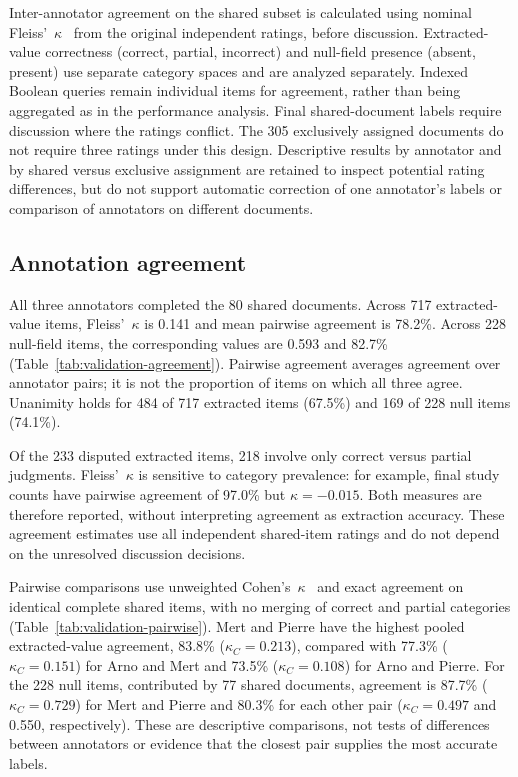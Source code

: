 Inter-annotator agreement on the shared subset is calculated using nominal Fleiss'~$\kappa$~\cite{fleiss:1971} from the original independent ratings, before discussion. Extracted-value correctness (correct, partial, incorrect) and null-field presence (absent, present) use separate category spaces and are analyzed separately. Indexed Boolean queries remain individual items for agreement, rather than being aggregated as in the performance analysis. Final shared-document labels require discussion where the ratings conflict. The 305 exclusively assigned documents do not require three ratings under this design. Descriptive results by annotator and by shared versus exclusive assignment are retained to inspect potential rating differences, but do not support automatic correction of one annotator's labels or comparison of annotators on different documents.

\subsection*{Annotation agreement}
All three annotators completed the 80 shared documents. Across 717 extracted-value items, Fleiss'~$\kappa$ is 0.141 and mean pairwise agreement is 78.2\%. Across 228 null-field items, the corresponding values are 0.593 and 82.7\% (Table~\ref{tab:validation-agreement}). Pairwise agreement averages agreement over annotator pairs; it is not the proportion of items on which all three agree. Unanimity holds for 484 of 717 extracted items (67.5\%) and 169 of 228 null items (74.1\%).

Of the 233 disputed extracted items, 218 involve only correct versus partial judgments. Fleiss'~$\kappa$ is sensitive to category prevalence: for example, final study counts have pairwise agreement of 97.0\% but $\kappa=-0.015$. Both measures are therefore reported, without interpreting agreement as extraction accuracy. These agreement estimates use all independent shared-item ratings and do not depend on the unresolved discussion decisions.



Pairwise comparisons use unweighted Cohen's~$\kappa$~\cite{cohen:1960} and exact agreement on identical complete shared items, with no merging of correct and partial categories (Table~\ref{tab:validation-pairwise}). Mert and Pierre have the highest pooled extracted-value agreement, 83.8\% ($\kappa_C=0.213$), compared with 77.3\% ($\kappa_C=0.151$) for Arno and Mert and 73.5\% ($\kappa_C=0.108$) for Arno and Pierre. For the 228 null items, contributed by 77 shared documents, agreement is 87.7\% ($\kappa_C=0.729$) for Mert and Pierre and 80.3\% for each other pair ($\kappa_C=0.497$ and 0.550, respectively). These are descriptive comparisons, not tests of differences between annotators or evidence that the closest pair supplies the most accurate labels.

